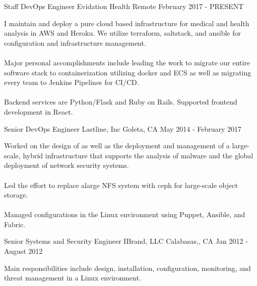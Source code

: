 
\begin{cventries}
  \cventry
    {Staff DevOps Engineer} %
    {Evidation Health} %
    {Remote} %
    {February 2017 - PRESENT} %
    {
      \begin{cvitems} %
          {I maintain and deploy a pure cloud based infrastructure for medical and health analysis in AWS and Heroku. We utilize terraform, saltstack, and ansible for configuration and infrastructure management. \\~\\ Major personal accomplishments include leading the work to migrate our entire software stack to containerization utilizing docker and ECS as well as migrating every team to Jenkins Pipelines for CI/CD. \\~\\ Backend services are Python/Flask and Ruby on Rails. Supported frontend development in React.}
      \end{cvitems}
    }

  \cventry
    {Senior DevOps Engineer} %
    {Lastline, Inc} %
    {Goleta, CA} %
    {May 2014 - February 2017} %
    {
      \begin{cvitems} %
        { Worked on the design of as well as the deployment and management of a large-scale, hybrid infrastructure that supports the analysis of malware and the global deployment of network security systems. \\~\\ Led the effort to replace alarge NFS system with ceph for large-scale object storage. \\~\\ Managed configurations in the Linux environment using Puppet, Ansible, and Fabric. }
      \end{cvitems}
    }

  \cventry
    {Senior Systems and Security Engineer} %
    {IBrand, LLC} %
    {Calabasas,, CA} %
    {Jan 2012 - August 2012} %
    {
      \begin{cvitems} %
        { Main responsibilities include design, installation, configuration, monitoring, and threat management in a Linux environment. }
      \end{cvitems}
    }


\end{cventries}
